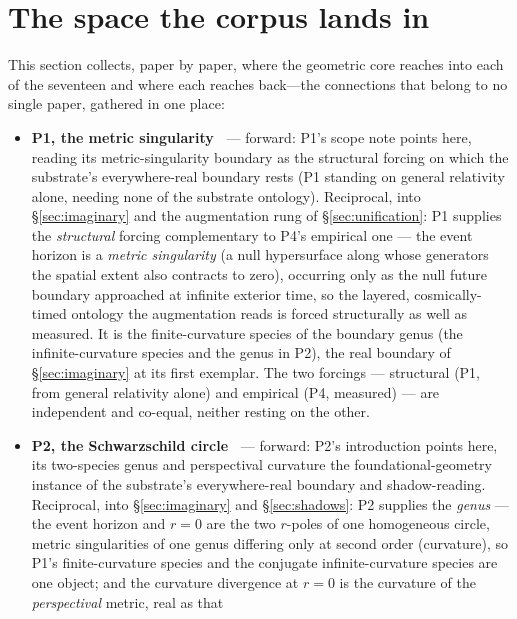 \documentclass[11pt,a4paper]{article}
\theoremstyle{definition}
\begin{document}
\section{The space the corpus lands in}\label{sec:landing}

This section collects, paper by paper, where the geometric core reaches into
each of the seventeen and where each reaches back---the connections that belong
to no single paper, gathered in one place:

\begin{itemize}
\item \textbf{P1, the metric singularity~\cite{JanzenBHcausality}} --- forward: P1's scope note points here, reading
its metric-singularity boundary as the structural forcing on which the
substrate's everywhere-real boundary rests (P1 standing on general relativity
alone, needing none of the substrate ontology). Reciprocal, into
\S\ref{sec:imaginary} and the augmentation rung of \S\ref{sec:unification}:
P1 supplies the \emph{structural} forcing complementary to P4's empirical one
--- the event horizon is a \emph{metric singularity} (a null hypersurface
along whose generators the spatial extent also contracts to zero), occurring
only as the null future boundary approached at infinite exterior time, so the
layered, cosmically-timed ontology the augmentation reads is forced
structurally as well as measured. It is the finite-curvature species of the
boundary genus (the infinite-curvature species and the genus in P2), the real
boundary of \S\ref{sec:imaginary} at its first exemplar. The two forcings ---
structural (P1, from general relativity alone) and empirical (P4, measured)
--- are independent and co-equal, neither resting on the other.
\item \textbf{P2, the Schwarzschild circle~\cite{JanzenCircle}} --- forward: P2's introduction points here, its
two-species genus and perspectival curvature the foundational-geometry
instance of the substrate's everywhere-real boundary and shadow-reading.
Reciprocal, into \S\ref{sec:imaginary} and \S\ref{sec:shadows}: P2 supplies
the \emph{genus} --- the event horizon and $r=0$ are the two $r$-poles of one
homogeneous circle, metric singularities of one genus differing only at second
order (curvature), so P1's finite-curvature species and the conjugate
infinite-curvature species are one object; and the curvature divergence at
$r=0$ is the curvature of the \emph{perspectival} metric, real as that

\end{itemize}
\end{document}
